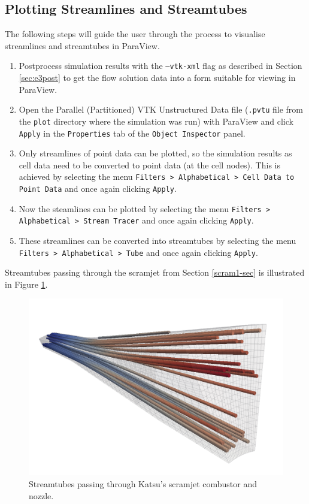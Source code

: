 \subsection{Plotting Streamlines and Streamtubes}
The following steps will guide the user through the process to visualise streamlines 
and streamtubes in ParaView.
\begin{enumerate}
\item Postprocess simulation results with the \texttt{--vtk-xml} flag as described in 
Section \ref{sec:e3post} to get the flow solution data into a form suitable for viewing in ParaView.
\item Open the Parallel (Partitioned) VTK Unstructured Data file (\texttt{.pvtu} 
file from the \texttt{plot} directory where the simulation was run) with ParaView 
and click \texttt{Apply} in the \texttt{Properties} tab of the \texttt{Object Inspector} panel.
\item Only streamlines of point data can be plotted, so the simulation results as 
cell data need to be converted to point data (at the cell nodes). This is achieved 
by selecting the menu \texttt{Filters > Alphabetical > Cell Data to Point Data} and 
once again clicking \texttt{Apply}.
\item Now the steamlines can be plotted by selecting the menu 
\texttt{Filters > Alphabetical > Stream Tracer} and once again clicking \texttt{Apply}.
\item These streamlines can be converted into streamtubes by selecting the menu 
\texttt{Filters > Alphabetical > Tube} and once again clicking \texttt{Apply}.
\end{enumerate}
Streamtubes passing through the scramjet from Section \ref{scram1-sec} is illustrated 
in Figure \ref{fig:scram-tubes}.
\begin{figure}[htbp]
\begin{center}
\includegraphics[width=12cm]{../3D/scramjet-1/scramjet-streamtubes.png}
\end{center}
\caption{Streamtubes passing through Katsu's scramjet combustor and nozzle.}
\label{fig:scram-tubes}
\end{figure}

